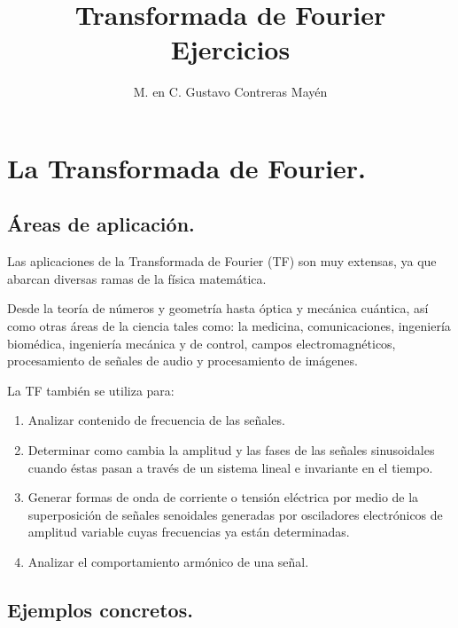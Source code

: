 
\title{Transformada de Fourier \\ \Large{Ejercicios}} \vspace{-3ex}
\author{M. en C. Gustavo Contreras Mayén}
\date{ }
\newcommand{\Cancel}[2][black]{{\color{#1}\cancel{\color{black}#2}}}

\vspace{-4cm}
\maketitle
\fontsize{14}{14}\selectfont
\tableofcontents
\newpage

\section{La Transformada de Fourier.}
\subsection{Áreas de aplicación.}

Las aplicaciones de la Transformada de Fourier (TF) son muy extensas, ya que abarcan diversas ramas de la física matemática.
\par
Desde la teoría de números y geometría hasta óptica y mecánica cuántica, así como otras áreas de la ciencia tales como: la medicina, comunicaciones, ingeniería biomédica, ingeniería mecánica y de control, campos electromagnéticos, procesamiento de señales de audio y procesamiento de imágenes.
\par
La TF también se utiliza para:
\begin{enumerate}
\item Analizar contenido de frecuencia de las señales.
\item Determinar como cambia la amplitud y las fases de las señales sinusoidales cuando éstas pasan a través de un sistema lineal e invariante en el tiempo.
\item Generar formas de onda de corriente o tensión eléctrica por medio de la superposición de señales senoidales generadas por osciladores electrónicos de amplitud variable cuyas frecuencias ya están determinadas.
\item Analizar el comportamiento armónico de una señal.
\end{enumerate}

\subsection{Ejemplos concretos.}


